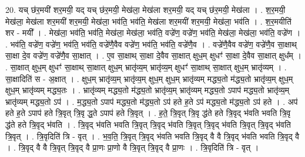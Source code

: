 \documentclass[17pt]{extarticle}
\begin{document}
20. यच् छ॑र॒मयी॑ शर॒मयी॒ यद् यच् छ॑र॒मयी॒ मेख॑ला॒ मेख॑ला शर॒मयी॒ यद् यच् छ॑र॒मयी॒ मेख॑ला । . श॒र॒मयी॒ मेख॑ला॒ मेख॑ला शर॒मयी॑ शर॒मयी॒ मेख॑ला॒ भव॑ति॒ भव॑ति॒ मेख॑ला शर॒मयी॑ शर॒मयी॒ मेख॑ला॒ भव॑ति । . श॒र॒मयीति॑ शर - मयी᳚ । . मेख॑ला॒ भव॑ति॒ भव॑ति॒ मेख॑ला॒ मेख॑ला॒ भव॑ति॒ वज्रे॑ण॒ वज्रे॑ण॒ भव॑ति॒ मेख॑ला॒ मेख॑ला॒ भव॑ति॒ वज्रे॑ण । . भव॑ति॒ वज्रे॑ण॒ वज्रे॑ण॒ भव॑ति॒ भव॑ति॒ वज्रे॑णै॒वैव वज्रे॑ण॒ भव॑ति॒ भव॑ति॒ वज्रे॑णै॒व । . वज्रे॑णै॒वैव वज्रे॑ण॒ वज्रे॑णै॒व सा॒क्षाथ् सा॒क्षा दे॒व वज्रे॑ण॒ वज्रे॑णै॒व सा॒क्षात् । . ए॒व सा॒क्षाथ् सा॒क्षा दे॒वैव सा॒क्षात् क्षुध॒म् क्षुधꣳ॑ सा॒क्षा दे॒वैव सा॒क्षात् क्षुध᳚म् । . सा॒क्षात् क्षुध॒म् क्षुधꣳ॑ सा॒क्षाथ् सा॒क्षात् क्षुध॒म् भ्रातृ॑व्य॒म् भ्रातृ॑व्य॒म् क्षुधꣳ॑ सा॒क्षाथ् सा॒क्षात् क्षुध॒म् भ्रातृ॑व्यम् । . सा॒क्षादिति॑ स - अ॒क्षात् । . क्षुध॒म् भ्रातृ॑व्य॒म् भ्रातृ॑व्य॒म् क्षुध॒म् क्षुध॒म् भ्रातृ॑व्यम् मद्ध्य॒तो म॑द्ध्य॒तो भ्रातृ॑व्य॒म् क्षुध॒म् क्षुध॒म् भ्रातृ॑व्यम् मद्ध्य॒तः । . भ्रातृ॑व्यम् मद्ध्य॒तो म॑द्ध्य॒तो भ्रातृ॑व्य॒म् भ्रातृ॑व्यम् मद्ध्य॒तो ऽपाप॑ मद्ध्य॒तो भ्रातृ॑व्य॒म् भ्रातृ॑व्यम् मद्ध्य॒तो ऽप॑ । . म॒द्ध्य॒तो ऽपाप॑ मद्ध्य॒तो म॑द्ध्य॒तो ऽप॑ हते ह॒ते ऽप॑ मद्ध्य॒तो म॑द्ध्य॒तो ऽप॑ हते । . अप॑ हते ह॒ते ऽपाप॑ हते त्रि॒वृत् त्रि॒वृ द्ध॒ते ऽपाप॑ हते त्रि॒वृत् । . ह॒ते॒ त्रि॒वृत् त्रि॒वृ द्ध॑ते हते त्रि॒वृद् भ॑वति भवति त्रि॒वृ द्ध॑ते हते त्रि॒वृद् भ॑वति । . त्रि॒वृद् भ॑वति भवति त्रि॒वृत् त्रि॒वृद् भ॑वति त्रि॒वृत् त्रि॒वृद् भ॑वति त्रि॒वृत् त्रि॒वृद् भ॑वति त्रि॒वृत् । . त्रि॒वृदिति॑ त्रि - वृत् । . भ॒व॒ति॒ त्रि॒वृत् त्रि॒वृद् भ॑वति भवति त्रि॒वृद् वै वै त्रि॒वृद् भ॑वति भवति त्रि॒वृद् वै । . त्रि॒वृद् वै वै त्रि॒वृत् त्रि॒वृद् वै प्रा॒णः प्रा॒णो वै त्रि॒वृत् त्रि॒वृद् वै प्रा॒णः । . त्रि॒वृदिति॑ त्रि - वृत् । \newline
\end{document}
